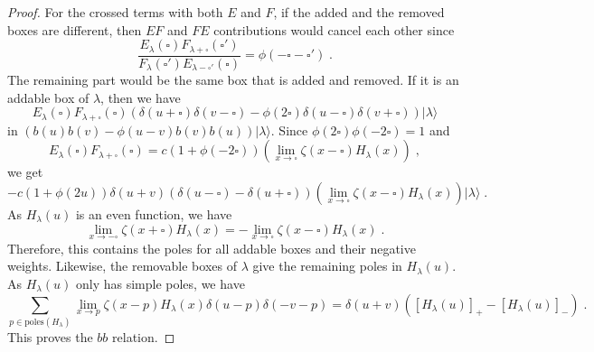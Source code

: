 \documentclass[11pt]{article}
\numberwithin{equation}{section}
\numberwithin{figure}{section}
\numberwithin{table}{section}
\begin{document}
\begin{proof}
	For the crossed terms with both $E$ and $F$, if the added and the removed boxes are different, then $EF$ and $FE$ contributions would cancel each other since
	\begin{equation}
		\frac{E_{\lambda}(\square)F_{\lambda+\square}(\square')}{F_{\lambda}(\square')E_{\lambda-\square'}(\square)}=\phi(-\square-\square')\;.
	\end{equation}
	The remaining part would be the same box that is added and removed. If it is an addable box of $\lambda$, then we have
	\begin{equation}
		E_\lambda(\square)F_{\lambda+\square}(\square)(\delta(u+\square)\delta(v-\square)-\phi(2\square)\delta(u-\square)\delta(v+\square))|\lambda\rangle
	\end{equation}
	in $(b(u)b(v)-\phi(u-v)b(v)b(u))|\lambda\rangle$. Since $\phi(2\square)\phi(-2\square)=1$ and
	\begin{equation}
		E_\lambda(\square)F_{\lambda+\square}(\square)=c(1+\phi(-2\square))\left(\lim_{x\rightarrow\square}\zeta(x-\square)H_\lambda(x)\right)\;,
	\end{equation}
	we get
	\begin{equation}
		-c(1+\phi(2u))\delta(u+v)(\delta(u-\square)-\delta(u+\square))\left(\lim_{x\rightarrow\square}\zeta(x-\square)H_\lambda(x)\right)|\lambda\rangle\;.
	\end{equation}
	As $H_\lambda(u)$ is an even function, we have
	\begin{equation}
		\lim_{x\rightarrow-\square}\zeta(x+\square)H_\lambda(x)=-\lim_{x\rightarrow\square}\zeta(x-\square)H_\lambda(x)\;.
	\end{equation}
	Therefore, this contains the poles for all addable boxes and their negative weights. Likewise, the removable boxes of $\lambda$ give the remaining poles in $H_\lambda(u)$. As $H_\lambda(u)$ only has simple poles, we have
	\begin{equation}
		\sum_{p\in\text{poles}(H_\lambda)}\lim_{x\rightarrow p}\zeta(x-p)H_\lambda(x)\delta(u-p)\delta(-v-p)=\delta(u+v)([H_\lambda(u)]_+-[H_\lambda(u)]_-)\;.
	\end{equation}
	This proves the $bb$ relation.


\end{proof}
\end{document}
